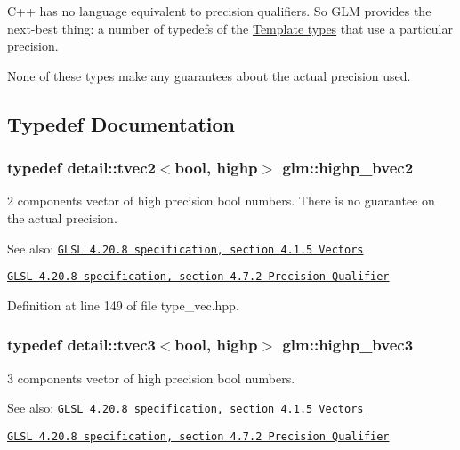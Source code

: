 C++ has no language equivalent to precision qualifiers. So GLM provides the next-best thing: a number of typedefs of the \hyperlink{group__core__template}{Template types} that use a particular precision.

None of these types make any guarantees about the actual precision used. 

\subsection{Typedef Documentation}
\hypertarget{group__core__precision_g4153415d1f3d390219ac9464652ac377}{
\subsubsection[highp\_\-bvec2]{\setlength{\rightskip}{0pt plus 5cm}typedef detail::tvec2$<$bool, highp$>$ {\bf glm::highp\_\-bvec2}}}
\label{group__core__precision_g4153415d1f3d390219ac9464652ac377}


2 components vector of high precision bool numbers. There is no guarantee on the actual precision.

\begin{Desc}
\item[See also:]\href{http://www.opengl.org/registry/doc/GLSLangSpec.4.20.8.pdf}{\tt GLSL 4.20.8 specification, section 4.1.5 Vectors} 

\href{http://www.opengl.org/registry/doc/GLSLangSpec.4.20.8.pdf}{\tt GLSL 4.20.8 specification, section 4.7.2 Precision Qualifier} \end{Desc}


Definition at line 149 of file type\_\-vec.hpp.\hypertarget{group__core__precision_g1d77a773fdd024602413670788c10c62}{
\subsubsection[highp\_\-bvec3]{\setlength{\rightskip}{0pt plus 5cm}typedef detail::tvec3$<$bool, highp$>$ {\bf glm::highp\_\-bvec3}}}
\label{group__core__precision_g1d77a773fdd024602413670788c10c62}


3 components vector of high precision bool numbers.

\begin{Desc}
\item[See also:]\href{http://www.opengl.org/registry/doc/GLSLangSpec.4.20.8.pdf}{\tt GLSL 4.20.8 specification, section 4.1.5 Vectors} 

\href{http://www.opengl.org/registry/doc/GLSLangSpec.4.20.8.pdf}{\tt GLSL 4.20.8 specification, section 4.7.2 Precision Qualifier} \end{Desc}


